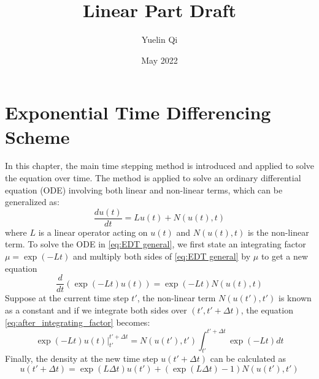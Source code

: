 \documentclass[12pt]{article}
\title{Linear Part Draft}
\author{Yuelin Qi}
\date{May 2022}
\numberwithin{equation}{section}
\begin{document}
\maketitle
\section{Exponential Time Differencing Scheme}
In this chapter, the main time stepping method is introduced and applied to solve the equation over time. The method is applied to solve an ordinary differential equation (ODE) involving both linear and non-linear terms, which can be generalized as:
\begin{equation}\label{eq:EDT general}
\frac{du(t)}{dt}=Lu(t)+N(u(t),t)
\end{equation}
where $L$ is a linear operator acting on $u(t)$ and $N(u(t),t)$ is the non-linear term. 
To solve the ODE in \eqref{eq:EDT general}, we first state an integrating factor $\mu=\exp(-Lt)$ and multiply both sides of \eqref{eq:EDT general} by $\mu$ to get a new equation
\begin{equation}\label{eq:after_integrating_factor}
\frac{d}{dt}(\exp(-Lt) u(t))=\exp(-Lt)N(u(t),t)
\end{equation}
Suppose at the current time step $t\prime$, the non-linear term $N(u(t\prime),t\prime)$ is known as a constant and if we integrate both sides over $(t\prime,t\prime+\Delta t)$, the equation \eqref{eq:after_integrating_factor} becomes:
\begin{equation}
\exp(-Lt) u(t)\Big | ^{t\prime+\Delta t}_{t\prime}=N(u(t\prime),t\prime) \int^{t\prime+\Delta t}_{t\prime}\exp(-Lt) dt 
\end{equation}
Finally, the density at the new time step $u(t\prime+\Delta t)$ can be calculated as
\begin{equation}
u(t\prime+\Delta t)= \exp (L \Delta t)u(t\prime)+(\exp(L\Delta t)-1)N(u(t\prime),t\prime)
\end{equation}
\end{document}

